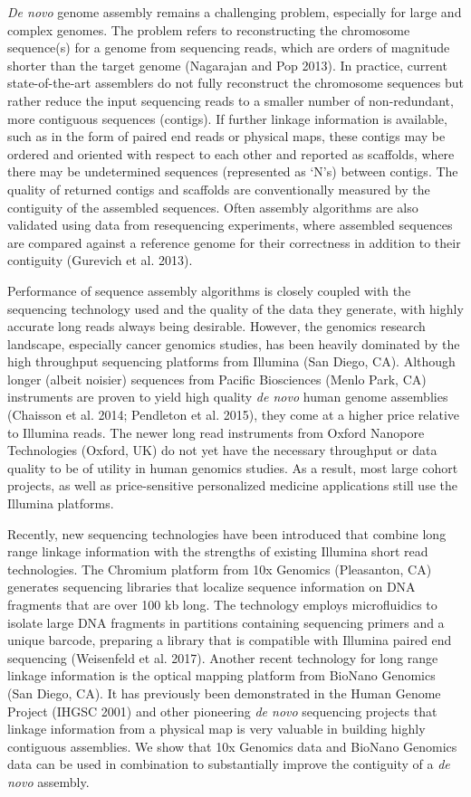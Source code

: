 \documentclass[
  12pt,
  oneside,
  openany]{book}
\begin{document}
\emph{De novo} genome assembly remains a challenging problem, especially for large and complex genomes. The problem refers to reconstructing the chromosome sequence(s) for a genome from sequencing reads, which are orders of magnitude shorter than the target genome (Nagarajan and Pop 2013). In practice, current state-of-the-art assemblers do not fully reconstruct the chromosome sequences but rather reduce the input sequencing reads to a smaller number of non-redundant, more contiguous sequences (contigs). If further linkage information is available, such as in the form of paired end reads or physical maps, these contigs may be ordered and oriented with respect to each other and reported as scaffolds, where there may be undetermined sequences (represented as `N's) between contigs. The quality of returned contigs and scaffolds are conventionally measured by the contiguity of the assembled sequences. Often assembly algorithms are also validated using data from resequencing experiments, where assembled sequences are compared against a reference genome for their correctness in addition to their contiguity (Gurevich et al. 2013).

Performance of sequence assembly algorithms is closely coupled with the sequencing technology used and the quality of the data they generate, with highly accurate long reads always being desirable. However, the genomics research landscape, especially cancer genomics studies, has been heavily dominated by the high throughput sequencing platforms from Illumina (San Diego, CA). Although longer (albeit noisier) sequences from Pacific Biosciences (Menlo Park, CA) instruments are proven to yield high quality \emph{de novo} human genome assemblies (Chaisson et al. 2014; Pendleton et al. 2015), they come at a higher price relative to Illumina reads. The newer long read instruments from Oxford Nanopore Technologies (Oxford, UK) do not yet have the necessary throughput or data quality to be of utility in human genomics studies. As a result, most large cohort projects, as well as price-sensitive personalized medicine applications still use the Illumina platforms.

Recently, new sequencing technologies have been introduced that combine long range linkage information with the strengths of existing Illumina short read technologies. The Chromium platform from 10x Genomics (Pleasanton, CA) generates sequencing libraries that localize sequence information on DNA fragments that are over 100 kb long. The technology employs microfluidics to isolate large DNA fragments in partitions containing sequencing primers and a unique barcode, preparing a library that is compatible with Illumina paired end sequencing (Weisenfeld et al. 2017). Another recent technology for long range linkage information is the optical mapping platform from BioNano Genomics (San Diego, CA). It has previously been demonstrated in the Human Genome Project (IHGSC 2001) and other pioneering \emph{de novo} sequencing projects that linkage information from a physical map is very valuable in building highly contiguous assemblies. We show that 10x Genomics data and BioNano Genomics data can be used in combination to substantially improve the contiguity of a \emph{de novo} assembly.
\end{document}
